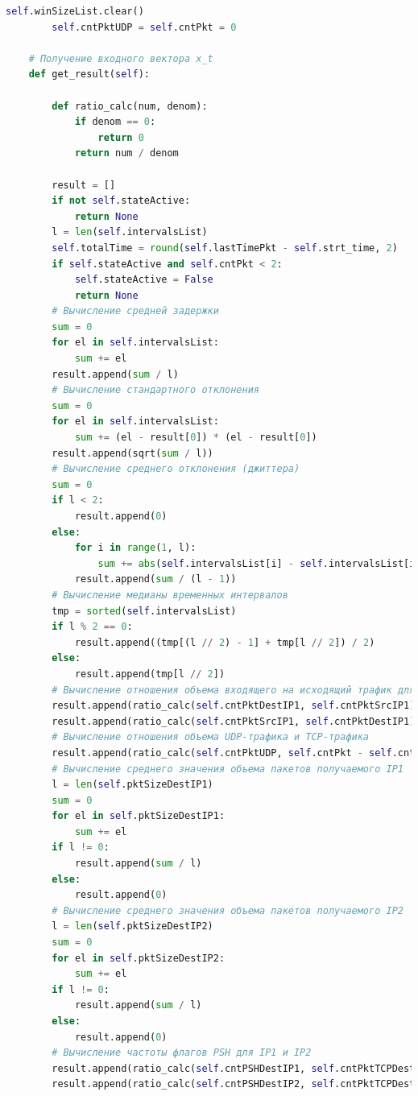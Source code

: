 \documentclass[spec, och, diploma]{SCWorks}
\begin{document}
\begin{lstlisting}[language=Python]
        self.winSizeList.clear()
        self.cntPktUDP = self.cntPkt = 0

    # Получение входного вектора x_t
    def get_result(self):
        
        def ratio_calc(num, denom):
            if denom == 0:
                return 0
            return num / denom

        result = []
        if not self.stateActive:
            return None
        l = len(self.intervalsList)
        self.totalTime = round(self.lastTimePkt - self.strt_time, 2)
        if self.stateActive and self.cntPkt < 2:
            self.stateActive = False
            return None
        # Вычисление средней задержки
        sum = 0
        for el in self.intervalsList:
            sum += el
        result.append(sum / l)
        # Вычисление стандартного отклонения
        sum = 0
        for el in self.intervalsList:
            sum += (el - result[0]) * (el - result[0])
        result.append(sqrt(sum / l))
        # Вычисление среднего отклонения (джиттера)
        sum = 0
        if l < 2:
            result.append(0)
        else:
            for i in range(1, l):
                sum += abs(self.intervalsList[i] - self.intervalsList[i - 1])
            result.append(sum / (l - 1))
        # Вычисление медианы временных интервалов
        tmp = sorted(self.intervalsList)
        if l % 2 == 0:
            result.append((tmp[(l // 2) - 1] + tmp[l // 2]) / 2)
        else:
            result.append(tmp[l // 2])
        # Вычисление отношения объема входящего на исходящий трафик для IP1 и IP2
        result.append(ratio_calc(self.cntPktDestIP1, self.cntPktSrcIP1))
        result.append(ratio_calc(self.cntPktSrcIP1, self.cntPktDestIP1))
        # Вычисление отношения объема UDP-трафика и TCP-трафика
        result.append(ratio_calc(self.cntPktUDP, self.cntPkt - self.cntPktUDP))
        # Вычисление среднего значения объема пакетов получаемого IP1
        l = len(self.pktSizeDestIP1)
        sum = 0
        for el in self.pktSizeDestIP1:
            sum += el
        if l != 0:
            result.append(sum / l)
        else:
            result.append(0)
        # Вычисление среднего значения объема пакетов получаемого IP2
        l = len(self.pktSizeDestIP2)
        sum = 0
        for el in self.pktSizeDestIP2:
            sum += el
        if l != 0:
            result.append(sum / l)
        else:
            result.append(0)
        # Вычисление частоты флагов PSH для IP1 и IP2
        result.append(ratio_calc(self.cntPSHDestIP1, self.cntPktTCPDestIP1))
        result.append(ratio_calc(self.cntPSHDestIP2, self.cntPktTCPDestIP2))

\end{lstlisting}
\end{document}
